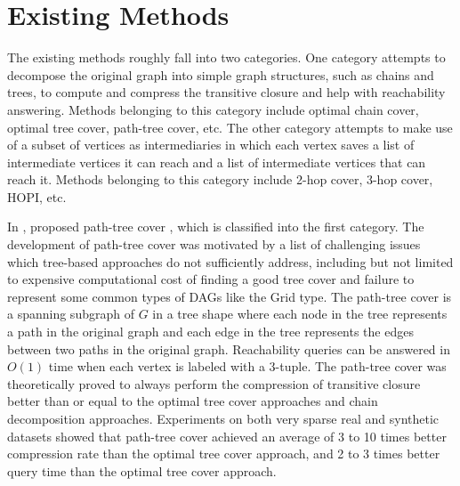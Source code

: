 \documentclass[12pt,conference,compsocconf]{../IEEEtran}
\begin{document}
\section{Existing Methods}

The existing methods roughly fall into two categories. One category attempts to decompose the original graph into simple graph structures, such as chains and trees, to compute and compress the transitive closure and help with reachability answering. Methods belonging to this category include optimal chain cover, optimal tree cover, path-tree cover, etc. The other category attempts to make use of a subset of vertices as intermediaries in which each vertex saves a list of intermediate vertices it can reach and a list of intermediate vertices that can reach it. Methods belonging to this category include 2-hop cover, 3-hop cover, HOPI, etc.

In \citeyear{1066},  proposed path-tree cover \citep{1066}, which is classified into the first category. The development of path-tree cover was motivated by a list of challenging issues which tree-based approaches do not sufficiently address, including but not limited to expensive computational cost of finding a good tree cover and failure to represent some common types of DAGs like the Grid type. The path-tree cover is a spanning subgraph of $G$ in a tree shape where each node in the tree represents a path in the original graph and each edge in the tree represents the edges between two paths in the original graph. Reachability queries can be answered in $O(1)$ time when each vertex is labeled with a 3-tuple. The path-tree cover was theoretically proved to always perform the compression of transitive closure better than or equal to the optimal tree cover approaches and chain decomposition approaches. Experiments on both very sparse real and synthetic datasets showed that path-tree cover achieved an average of 3 to 10 times better compression rate than the optimal tree cover approach, and 2 to 3 times better query time than the optimal tree cover approach.
\end{document}
